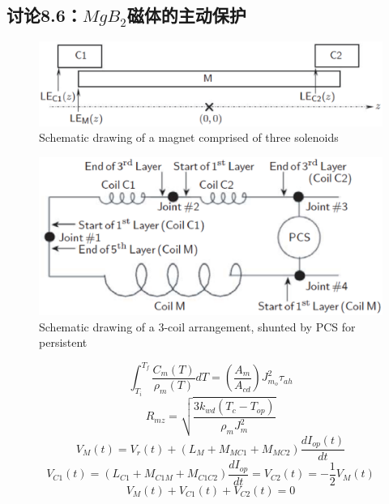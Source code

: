 \subsection{讨论8.6：$MgB_2$磁体的主动保护}



\begin{figure}
	\centering
	\includegraphics[scale=0.6]{chpt8/figs/fig8.24.eps}
	\caption{Schematic drawing of a magnet comprised of three solenoids}
\end{figure}


\begin{figure}
	\centering
	\includegraphics[scale=0.6]{chpt8/figs/fig8.25.eps}
	\caption{Schematic drawing of a 3-coil arrangement, shunted by PCS for persistent}
\end{figure}




\begin{equation}%
\int_{T_i}^{T_f}\frac{C_m(T)}{\rho_m(T)}dT=\left(\frac{A_m}{A_{cd}}\right)J_{m_o}^{2}\tau_{ah}
\end{equation}
\begin{equation}%
R_{mz}=\sqrt{\frac{3k_{wd}(T_c-T_{op})}{\rho_mJ_{m}^{2}}}
\end{equation}
\begin{equation}%
V_M(t)=V_r(t)+(L_M+M_{MC1}+M_{MC2})\frac{dI_{op}(t)}{dt}
\end{equation}
\begin{equation}%
V_{C1}(t)=(L_{C1}+M_{C1M}+M_{C1C2})\frac{dI_{op}}{dt}=V_{C2}(t)=-\frac{1}{2}V_M(t)
\end{equation}
\begin{equation}%
V_M(t)+V_{C1}(t)+V_{C2}(t)=0
\end{equation}



